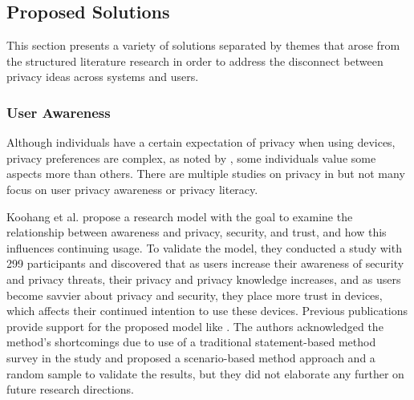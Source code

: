 \subsection{Proposed Solutions}\label{subsection:proposed_solutions}

\par This section presents a variety of solutions separated by themes that arose
from the structured literature research in order to address the disconnect
between privacy ideas across systems and users.

\subsubsection{User Awareness}\label{subsubsection:user_awareness}

Although individuals have a certain expectation of privacy when using \hyperlink{\acronym}{\acronym}
devices, privacy preferences are complex, as noted by \cite{naeini2017privacy},
some individuals value some aspects more than others. There are multiple studies
on privacy in \hyperlink{\acronym}{\acronym} but not many focus on user privacy awareness or
privacy literacy.

Koohang et al. \cite{koohang2022internet} propose a research model with
the goal to examine the relationship between \hyperlink{\acronym}{\acronym} awareness and \hyperlink{\acronym}{\acronym} privacy,
security, and trust, and how this influences \hyperlink{\acronym}{\acronym} continuing usage. To validate
the model, they conducted a study with 299 participants and discovered that
as users increase their awareness of \hyperlink{\acronym}{\acronym} security and privacy threats, their
privacy and privacy knowledge increases, and as users become savvier about
\hyperlink{\acronym}{\acronym} privacy and security, they place more trust in \hyperlink{\acronym}{\acronym} devices, which affects
their continued intention to use these \hyperlink{\acronym}{\acronym} devices. Previous publications
provide support for the proposed model like \cite{tsourela2020internet, knijnenburg2022modern}.
The authors acknowledged the method's shortcomings due to use of a traditional
statement-based method survey in the study and proposed a scenario-based
method approach and a random sample to validate the results, but they did
not elaborate any further on future research directions.

